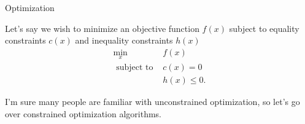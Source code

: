 

    


    

\begin{frame}{Optimization} 

    Let's say we wish to minimize an objective function $ 
f( x ) $ subject to equality constraints $ c( x ) $ and inequality constraints $ h( x ) $
% 
    \begin{align}
        \min_{ x } \;      & f( x ) \\ 
        \text{ subject to }             & c( x ) = 0 \\  
                                        & h( x ) \leq 0 .   
    \end{align} 

    I'm sure many people are familiar with unconstrained optimization, so 
    let's go over constrained optimization algorithms. 
    
\end{frame} 





    

